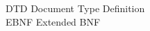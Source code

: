 \begin{tabbing}



    \>DTD \>\>Document Type Definition\\









    \>EBNF \>\>Extended BNF\\










\end{tabbing}

